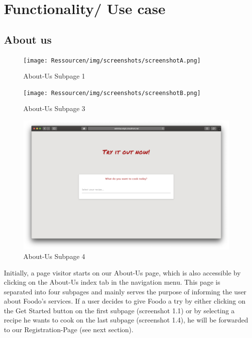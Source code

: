 \chapter{Functionality/ Use case}
\section*{About us}
\vspace{-2em}
\begin{figure}[H]
	\captionsetup{justification=centering}
	\begin{center}
		\texttt{[image: Ressourcen/img/screenshots/screenshotA.png]}
		\vspace{-3em}
		\caption{About-Us Subpage 1}
	\end{center}
\end{figure}
\vspace{-2em}
\begin{figure}[H]
	\captionsetup{justification=centering}
	\begin{center}
		\texttt{[image: Ressourcen/img/screenshots/screenshotB.png]}
		\vspace{-3em}
		\caption{About-Us Subpage 3}
	\end{center}
\end{figure}
\vspace{-2em}
\begin{figure}[H]
	\captionsetup{justification=centering}
	\begin{center}
		\includegraphics[scale=0.25]{Ressourcen/img/screenshots/screenshotC.png}
		\vspace{-3em}
		\caption{About-Us Subpage 4}
	\end{center}
\end{figure}
Initially, a page visitor starts on our About-Us page, which is also accessible by clicking on the About-Us index tab in the navigation menu. This page is separated into four subpages and mainly serves the purpose of informing the user about Foodo's services. If a user decides to give Foodo a try by either clicking on the Get Started button on the first subpage (screenshot 1.1) or by selecting a recipe he wants to cook on the last subpage (screenshot 1.4), he will be forwarded to our Registration-Page (see next section).
